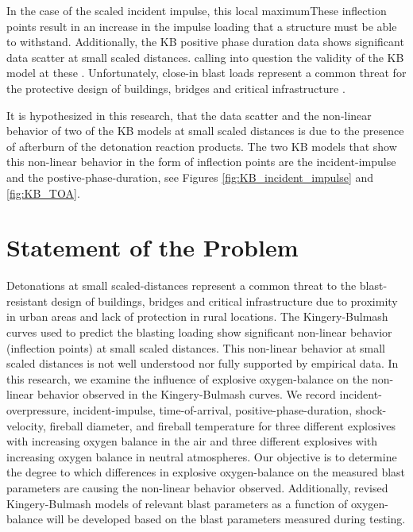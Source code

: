 In the case of the scaled incident impulse, this local maximumThese inflection points result in an increase in the impulse loading that a structure must be able to withstand. Additionally, the KB positive phase duration data shows significant data scatter at small scaled distances.  calling into question the validity of the KB model at these .   Unfortunately, close-in blast loads represent a common threat for the protective design of buildings, bridges and critical infrastructure \cite{Shin2015a}\cite{Shin2014}.

It is hypothesized in this research, that the data scatter and the non-linear behavior of two of the KB models at small scaled distances is due to the presence of afterburn of the detonation reaction products.  The two KB models that show this non-linear behavior in the form of inflection points are the incident-impulse and the postive-phase-duration, see Figures \ref{fig:KB_incident_impulse} and \ref{fig:KB_TOA}. 
  

\section{Statement of the Problem}
Detonations at small scaled-distances represent a common threat to the blast-resistant design of buildings, bridges and critical infrastructure due to proximity in urban areas and lack of protection in rural locations. The Kingery-Bulmash curves used to predict the blasting loading show significant non-linear behavior (inflection points) at small scaled distances.  This non-linear behavior at small scaled distances is not well understood nor fully supported by empirical data.
In this research, we examine the influence of explosive oxygen-balance on the non-linear behavior observed in the Kingery-Bulmash curves. We record incident-overpressure, incident-impulse, time-of-arrival, positive-phase-duration, shock-velocity, fireball diameter, and fireball temperature for three different explosives with increasing oxygen balance in the air and three different explosives with increasing oxygen balance in neutral atmospheres.   Our objective is to determine the degree to which differences in explosive oxygen-balance on the measured blast parameters are causing the non-linear behavior observed.  Additionally, revised Kingery-Bulmash models of relevant blast parameters as a function of oxygen-balance will be developed based on the blast parameters measured during testing.


